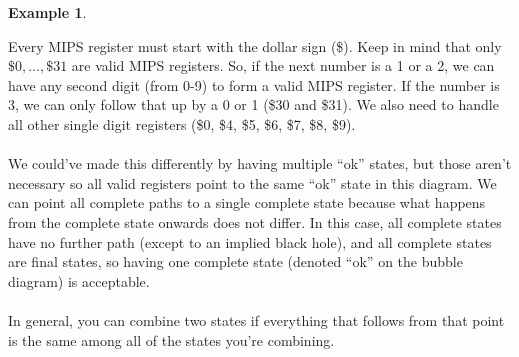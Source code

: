 \documentclass[]{article}
\theoremstyle{definition}
\newtheorem{ex}{Example}[section]
\begin{document}
\begin{ex}
\begin{center}
				\end{center}
				
				Every MIPS register must start with the dollar sign (\$). Keep in mind that only $\$0, \ldots, \$31$ are valid MIPS registers. So, if the next number is a 1 or a 2, we can have any second digit (from 0-9) to form a valid MIPS register. If the number is 3, we can only follow that up by a 0 or 1 (\$30 and \$31). We also need to handle all other single digit registers (\$0, \$4, \$5, \$6, \$7, \$8, \$9).
				\\ \\
				We could've made this differently by having multiple ``ok'' states, but those aren't necessary so all valid registers point to the same ``ok'' state in this diagram. We can point all complete paths to a single complete state because what happens from the complete state onwards does not differ. In this case, all complete states have no further path (except to an implied black hole), and all complete states are final states, so having one complete state (denoted ``ok'' on the bubble diagram) is acceptable.
				\\ \\
				In general, you can combine two states if everything that follows from that point is the same among all of the states you're combining.
			\end{ex}
\end{document}

